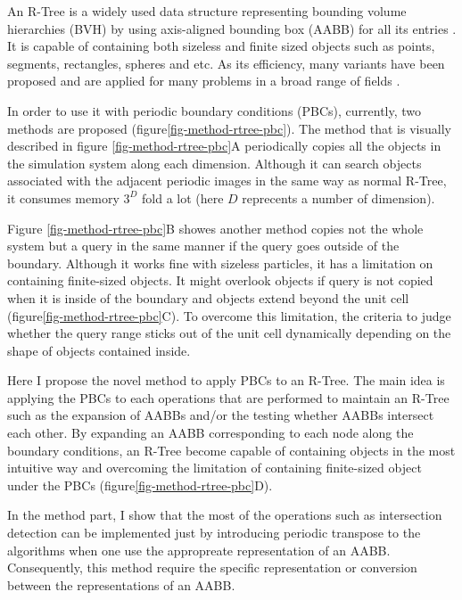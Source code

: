 \documentclass[10pt,letterpaper,twocolumn]{article}
\begin{document}
An R-Tree is a widely used data structure representing bounding volume
hierarchies (BVH) by using axis-aligned bounding box (AABB) for all its entries
\cite{Guttman1984}. It is capable of containing both sizeless and finite sized
objects such as points, segments, rectangles, spheres and etc. As its efficiency,
many variants have been proposed and are applied for many problems in a broad
range of fields \cite{Beckmann1990, Leuteneggert1997, Berchtold2001, CoSTR-R-tree2016}.

In order to use it with periodic boundary conditions (PBCs), currently,
two methods are proposed (figure\ref{fig-method-rtree-pbc})\cite{CoSTR-R-tree2016}.
The method that is visually described in figure \ref{fig-method-rtree-pbc}A
periodically copies all the objects in the simulation system along each dimension.
Although it can search objects associated with the adjacent periodic images in
the same way as normal R-Tree, it consumes memory $3^D$ fold a lot (here $D$
reprecents a number of dimension).

Figure \ref{fig-method-rtree-pbc}B showes another method copies not the whole
system but a query in the same manner if the query goes outside of the boundary.
Although it works fine with sizeless particles, it has a limitation on
containing finite-sized objects. It might overlook objects if query is not copied
when it is inside of the boundary and objects extend beyond the unit cell
(figure\ref{fig-method-rtree-pbc}C). To overcome this limitation, the criteria
to judge whether the query range sticks out of the unit cell dynamically
depending on the shape of objects contained inside.

Here I propose the novel method to apply PBCs to an R-Tree. The main idea is
applying the PBCs to each operations that are performed to maintain an R-Tree
such as the expansion of AABBs and/or the testing whether AABBs intersect
each other.
By expanding an AABB corresponding to each node along the boundary conditions,
an R-Tree become capable of containing objects in the most intuitive way and
overcoming the limitation of containing finite-sized object under the PBCs
(figure\ref{fig-method-rtree-pbc}D).

In the method part, I show that the most of the operations such as intersection
detection can be implemented just by introducing periodic transpose to the
algorithms when one use the appropreate representation of an AABB.
Consequently, this method require the specific representation or
conversion between the representations of an AABB.
\end{document}
